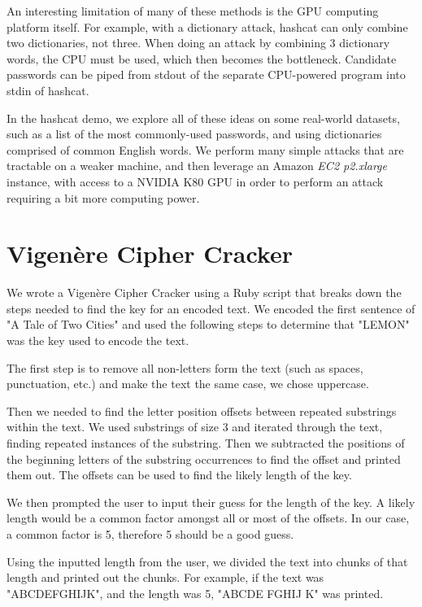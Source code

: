 \documentclass[acmlarge]{acmart}
\begin{document}
An interesting limitation of many of these methods is the GPU computing platform itself. For example, with a dictionary attack, hashcat can only combine two dictionaries, not three. When doing an attack by combining 3 dictionary words, the CPU must be used, which then becomes the bottleneck. Candidate passwords can be piped from stdout of the separate CPU-powered program into stdin of hashcat.

In the hashcat demo, we explore all of these ideas on some real-world datasets, such as a list of the most commonly-used passwords, and using dictionaries comprised of common English words. We perform many simple attacks that are tractable on a weaker machine, and then leverage an Amazon \textit{EC2 p2.xlarge} instance, with access to a NVIDIA K80 GPU in order to perform an attack requiring a bit more computing power.

\section{Vigen\`{e}re Cipher Cracker}\label{sec:vinegar}

We wrote a Vigen\`{e}re Cipher Cracker using a Ruby script that breaks down the steps needed to find the key for an encoded text. We encoded the first sentence of "A Tale of Two Cities" and used the following steps to determine that "LEMON" was the key used to encode the text.

The first step is to remove all non-letters form the text (such as spaces, punctuation, etc.) and make the text the same case, we chose uppercase.

Then we needed to find the letter position offsets between repeated substrings within the text. We used substrings of size 3 and iterated through the text, finding repeated instances of the substring. Then we subtracted the positions of the beginning letters of the substring occurrences to find the offset and printed them out. The offsets can be used to find the likely length of the key.

We then prompted the user to input their guess for the length of the key. A likely length would be a common factor amongst all or most of the offsets. In our case, a common factor is 5, therefore 5 should be a good guess.

Using the inputted length from the user, we divided the text into chunks of that length and printed out the chunks. For example, if the text was "ABCDEFGHIJK", and the length was 5, "ABCDE FGHIJ K" was printed.
\end{document}
